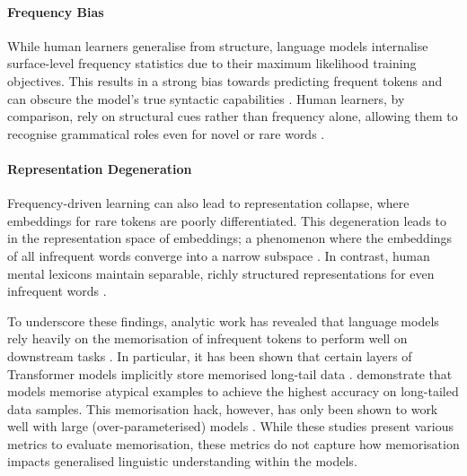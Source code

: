 \paragraph{Frequency Bias} While human learners generalise from structure, language models internalise surface-level frequency statistics due to their maximum likelihood training objectives. This results in a strong bias towards predicting frequent tokens and can obscure the model's true syntactic capabilities \citep{feldman2020does, haviv2023understanding}. Human learners, by comparison, rely on structural cues rather than frequency alone, allowing them to recognise grammatical roles even for novel or rare words \citep{tomasello2003constructing}.

\paragraph{Representation Degeneration} Frequency-driven learning can also lead to representation collapse, where embeddings for rare tokens are poorly differentiated. This degeneration leads to  in the representation space of embeddings; a phenomenon where the embeddings of all infrequent words converge into a narrow subspace \citep{ethayarajh2019contextual}. In contrast, human mental lexicons maintain separable, richly structured representations for even infrequent words \citep{murphy2002bigbook}.

\vspace{1em}

To underscore these findings, analytic work has revealed that language models rely heavily on the memorisation of infrequent tokens to perform well on downstream tasks \citep{feldman2020does}. In particular, it has been shown that certain layers of Transformer models implicitly store memorised long-tail data \citep{haviv2023understanding, kobayashi2023transformer}. \citet{feldman2020neural} demonstrate that models memorise atypical examples to achieve the highest accuracy on long-tailed data samples. This memorisation hack, however, has only been shown to work well with large (over-parameterised) models \citep{belkin2019reconciling}. While these studies present various metrics to evaluate memorisation, these metrics do not capture how memorisation impacts generalised linguistic understanding within the models.  %

